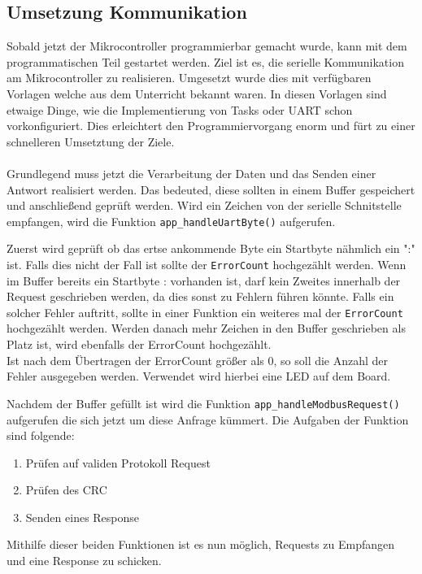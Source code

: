 \subsection{Umsetzung Kommunikation} \label{ssec:konzeptCardDeal}
Sobald jetzt der Mikrocontroller programmierbar gemacht wurde, kann mit dem programmatischen Teil gestartet werden.
Ziel ist es, die serielle Kommunikation am Mikrocontroller zu realisieren.
Umgesetzt wurde dies mit verfügbaren Vorlagen welche aus dem Unterricht bekannt waren.
In diesen Vorlagen sind etwaige Dinge, wie die Implementierung von Tasks oder UART schon vorkonfiguriert.
Dies erleichtert den Programmiervorgang enorm und fürt zu einer schnelleren Umsetztung der Ziele.\\\\
Grundlegend muss jetzt die Verarbeitung der Daten und das Senden einer Antwort realisiert werden.
Das bedeuted, diese sollten in einem Buffer gespeichert und anschließend geprüft werden.
Wird ein Zeichen von der serielle Schnitstelle empfangen, wird die Funktion \lstinline[style=C]{app_handleUartByte()} aufgerufen.

Zuerst wird geprüft ob das ertse ankommende Byte ein Startbyte nähmlich ein ":" ist.
Falls dies nicht der Fall ist sollte der \lstinline[style=C]{ErrorCount} hochgezählt werden.
Wenn im Buffer bereits ein Startbyte : vorhanden ist, darf kein Zweites innerhalb der Request geschrieben werden, da dies sonst zu Fehlern führen könnte.
Falls ein solcher Fehler auftritt, sollte in einer Funktion ein weiteres mal der \lstinline[style=C]{ErrorCount} hochgezählt werden.
Werden danach mehr Zeichen in den Buffer geschrieben als Platz ist, wird ebenfalls der ErrorCount hochgezählt.\\
Ist nach dem Übertragen der ErrorCount größer als 0, so soll die Anzahl der Fehler ausgegeben werden.
Verwendet wird hierbei eine LED auf dem Board.

Nachdem der Buffer gefüllt ist wird die Funktion \lstinline[style=C]{app_handleModbusRequest()} aufgerufen die sich jetzt um diese Anfrage kümmert.
Die Aufgaben der Funktion sind folgende:
\begin{enumerate}
\item Prüfen auf validen Protokoll Request
\item Prüfen des CRC
\item Senden eines Response
\end{enumerate}
Mithilfe dieser beiden Funktionen ist es nun möglich, Requests zu Empfangen und eine Response zu schicken.
